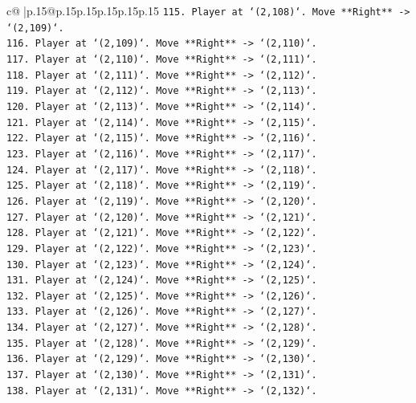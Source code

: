 \documentclass{article}
\begin{document}
{\begin{supertabular}{c@{$\;$}|p{.15\linewidth}@{}p{.15\linewidth}p{.15\linewidth}p{.15\linewidth}p{.15\linewidth}p{.15\linewidth}}
{{{\texttt{115. Player at `(2,108)`. Move **Right** {-}> `(2,109)`.} \\
\texttt{116. Player at `(2,109)`. Move **Right** {-}> `(2,110)`.} \\
\texttt{117. Player at `(2,110)`. Move **Right** {-}> `(2,111)`.} \\
\texttt{118. Player at `(2,111)`. Move **Right** {-}> `(2,112)`.} \\
\texttt{119. Player at `(2,112)`. Move **Right** {-}> `(2,113)`.} \\
\texttt{120. Player at `(2,113)`. Move **Right** {-}> `(2,114)`.} \\
\texttt{121. Player at `(2,114)`. Move **Right** {-}> `(2,115)`.} \\
\texttt{122. Player at `(2,115)`. Move **Right** {-}> `(2,116)`.} \\
\texttt{123. Player at `(2,116)`. Move **Right** {-}> `(2,117)`.} \\
\texttt{124. Player at `(2,117)`. Move **Right** {-}> `(2,118)`.} \\
\texttt{125. Player at `(2,118)`. Move **Right** {-}> `(2,119)`.} \\
\texttt{126. Player at `(2,119)`. Move **Right** {-}> `(2,120)`.} \\
\texttt{127. Player at `(2,120)`. Move **Right** {-}> `(2,121)`.} \\
\texttt{128. Player at `(2,121)`. Move **Right** {-}> `(2,122)`.} \\
\texttt{129. Player at `(2,122)`. Move **Right** {-}> `(2,123)`.} \\
\texttt{130. Player at `(2,123)`. Move **Right** {-}> `(2,124)`.} \\
\texttt{131. Player at `(2,124)`. Move **Right** {-}> `(2,125)`.} \\
\texttt{132. Player at `(2,125)`. Move **Right** {-}> `(2,126)`.} \\
\texttt{133. Player at `(2,126)`. Move **Right** {-}> `(2,127)`.} \\
\texttt{134. Player at `(2,127)`. Move **Right** {-}> `(2,128)`.} \\
\texttt{135. Player at `(2,128)`. Move **Right** {-}> `(2,129)`.} \\
\texttt{136. Player at `(2,129)`. Move **Right** {-}> `(2,130)`.} \\
\texttt{137. Player at `(2,130)`. Move **Right** {-}> `(2,131)`.} \\
\texttt{138. Player at `(2,131)`. Move **Right** {-}> `(2,132)`.} \\
}}}
\end{supertabular}}
\end{document}
